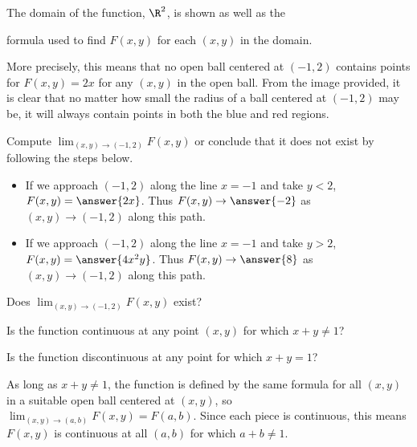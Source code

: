 \documentclass{ximera}
\newcommand{\point}[1]{\left(#1\right)} %
\newcommand{\Lim}[2]{\lim_{\point{#1} \to \point{#2}}}
\begin{document}
\begin{exercise}
\begin{exercise}
\begin{feedback}[correct]
\begin{image}
\end{image}
\begin{center}
The domain of the function, $\R^2$, is shown as well as the 

formula used to find $F(x,y)$ for each $(x,y)$ in the domain.
\end{center}

More precisely, this means that no open ball centered at $(-1,2)$ contains points for $F(x,y) = 2x$ for any $(x,y)$ in the open ball. From the image provided, it is clear that no matter how small the radius of a ball centered at $(-1,2)$ may be, it will always contain points in both the blue and red regions.
\end{feedback}

\begin{exercise}
Compute $\Lim{x,y}{-1,2} F(x,y)$ or conclude that it does not exist by following the steps below.

\begin{itemize}
\item If we approach $(-1,2)$ along the line $x=-1$ and take $y<2$, $F(x,y) = \answer{2x}$.  Thus $F(x,y) \to \answer{-2}$ as $\point{x,y} \to \point{-1,2}$ along this path.
\item If we approach $(-1,2)$ along the line $x=-1$ and take $y>2$, $F(x,y) = \answer{4x^2y}$.  Thus $F(x,y) \to \answer{8}$ as $\point{x,y} \to \point{-1,2}$ along this path.
\end{itemize}

Does $\Lim{x,y}{-1,2} F(x,y)$ exist? 
\end{exercise}
\end{exercise}

\begin{exercise}
Is the function continuous at any point $(x,y)$ for which $x+y \neq 1$? 

Is the function discontinuous at any point for which $x+y =1$? 

\begin{feedback}[correct]
As long as $x+y \neq 1$, the function is defined by the same formula for all $(x,y)$ in a suitable open ball centered at $(x,y)$, so $\Lim{x,y}{a,b}F(x,y) = F(a,b)$.  Since each piece is continuous, this means $F(x,y)$ is continuous at all $(a,b)$ for which $a+b \neq 1$.


\end{feedback}
\end{exercise}
\end{exercise}
\end{document}
